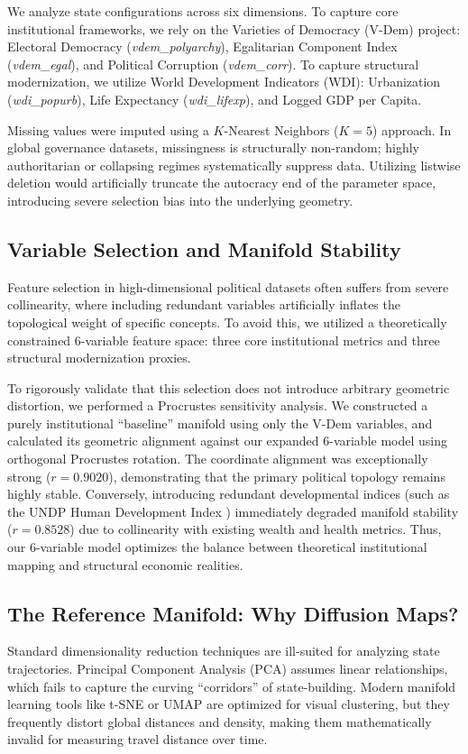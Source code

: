 \documentclass[12pt]{article}
\begin{document}
We analyze state configurations across six dimensions. To capture core institutional frameworks, we rely on the Varieties of Democracy (V-Dem) project: Electoral Democracy (\textit{vdem\_polyarchy}), Egalitarian Component Index (\textit{vdem\_egal}), and Political Corruption (\textit{vdem\_corr}). To capture structural modernization, we utilize World Development Indicators (WDI): Urbanization (\textit{wdi\_popurb}), Life Expectancy (\textit{wdi\_lifexp}), and Logged GDP per Capita.

Missing values were imputed using a $K$-Nearest Neighbors ($K=5$) approach. In global governance datasets, missingness is structurally non-random; highly authoritarian or collapsing regimes systematically suppress data. Utilizing listwise deletion would artificially truncate the autocracy end of the parameter space, introducing severe selection bias into the underlying geometry.

\subsection{Variable Selection and Manifold Stability}
Feature selection in high-dimensional political datasets often suffers from severe collinearity, where including redundant variables artificially inflates the topological weight of specific concepts. To avoid this, we utilized a theoretically constrained 6-variable feature space: three core institutional metrics and three structural modernization proxies.

To rigorously validate that this selection does not introduce arbitrary geometric distortion, we performed a Procrustes sensitivity analysis. We constructed a purely institutional ``baseline'' manifold using only the V-Dem variables, and calculated its geometric alignment against our expanded 6-variable model using orthogonal Procrustes rotation. The coordinate alignment was exceptionally strong ($r = 0.9020$), demonstrating that the primary political topology remains highly stable. Conversely, introducing redundant developmental indices (such as the UNDP Human Development Index \cite{undp2024hdi}) immediately degraded manifold stability ($r = 0.8528$) due to collinearity with existing wealth and health metrics. Thus, our 6-variable model optimizes the balance between theoretical institutional mapping and structural economic realities.

\subsection{The Reference Manifold: Why Diffusion Maps?}
Standard dimensionality reduction techniques are ill-suited for analyzing state trajectories. Principal Component Analysis (PCA) assumes linear relationships, which fails to capture the curving ``corridors'' of state-building. Modern manifold learning tools like t-SNE or UMAP are optimized for visual clustering, but they frequently distort global distances and density, making them mathematically invalid for measuring travel distance over time.
\end{document}
